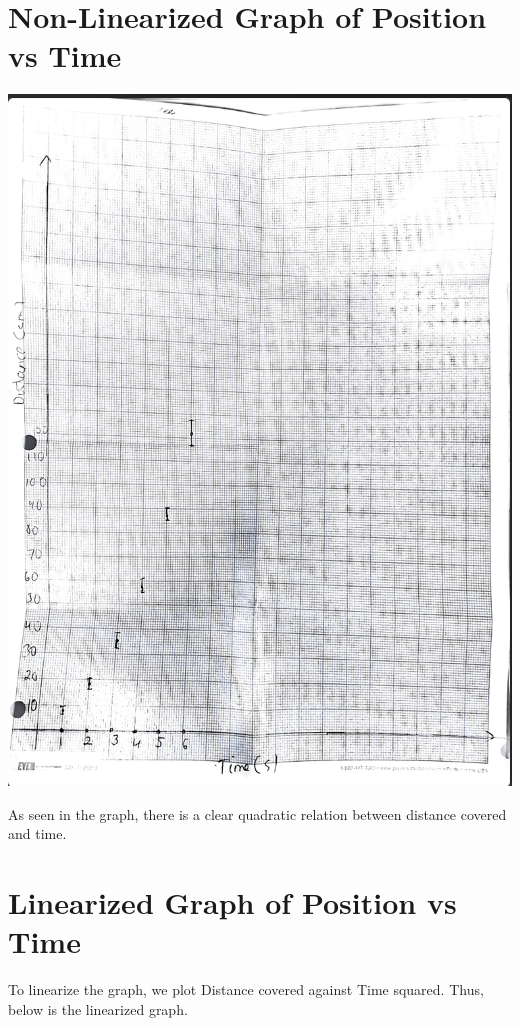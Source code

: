 \documentclass[12pt, letterpaper]{article}
\begin{document}
\section{Non-Linearized Graph of Position vs Time}
    \includegraphics[width=0.75\linewidth]{Phys 141//Lab Reports/unlinearised.png}
    
    As seen in the graph, there is a clear quadratic relation between distance covered and time. 

\section{Linearized Graph of Position vs Time}
To linearize the graph, we plot Distance covered against Time squared. Thus, below is the linearized graph.
\end{document}
